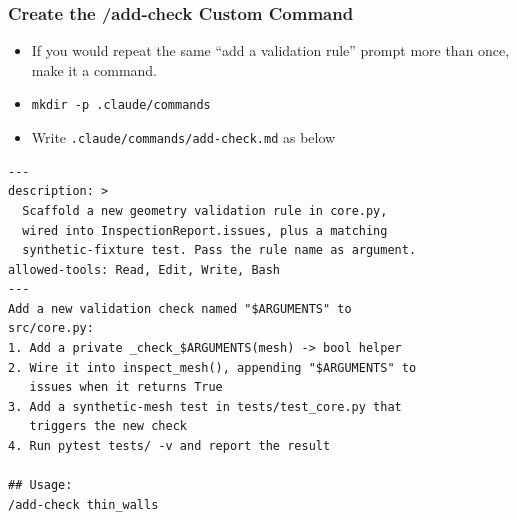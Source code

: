 \begin{frame}[fragile]\frametitle{Create the /add-check Custom Command}
  \begin{itemize}
	\item If you would repeat the same ``add a validation rule'' prompt more than once, make it a command.
	\item \lstinline|mkdir -p .claude/commands|
	\item Write \lstinline|.claude/commands/add-check.md| as below
  \end{itemize}

\begin{lstlisting}
---
description: >
  Scaffold a new geometry validation rule in core.py,
  wired into InspectionReport.issues, plus a matching
  synthetic-fixture test. Pass the rule name as argument.
allowed-tools: Read, Edit, Write, Bash
---
Add a new validation check named "$ARGUMENTS" to
src/core.py:
1. Add a private _check_$ARGUMENTS(mesh) -> bool helper
2. Wire it into inspect_mesh(), appending "$ARGUMENTS" to
   issues when it returns True
3. Add a synthetic-mesh test in tests/test_core.py that
   triggers the new check
4. Run pytest tests/ -v and report the result

## Usage:
/add-check thin_walls
\end{lstlisting}
\end{frame}


